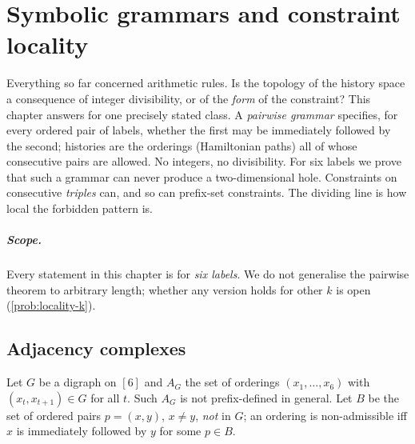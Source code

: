 \chapter{Symbolic grammars and constraint locality}\label{ch:locality}

Everything so far concerned arithmetic rules. Is the topology of the history space a consequence of integer divisibility, or of the \emph{form} of the constraint? This chapter answers for one precisely stated class. A \emph{pairwise grammar} specifies, for every ordered pair of labels, whether the first may be immediately followed by the second; histories are the orderings (Hamiltonian paths) all of whose consecutive pairs are allowed. No integers, no divisibility. For six labels we prove that such a grammar can never produce a two-dimensional hole. Constraints on consecutive \emph{triples} can, and so can prefix-set constraints. The dividing line is how local the forbidden pattern is.

\paragraph{Scope.} Every statement in this chapter is for \emph{six labels}. We do not generalise the pairwise theorem to arbitrary length; whether any version holds for other $k$ is open (\cref{prob:locality-k}).

\section{Adjacency complexes}\label{sec:adjacency}
Let $G$ be a digraph on $[6]$ and $A_G$ the set of orderings $(x_1,\dots,x_6)$ with $(x_t,x_{t+1})\in G$ for all $t$. Such $A_G$ is not prefix-defined in general. Let $B$ be the set of ordered pairs $p=(x,y)$, $x\ne y$, \emph{not} in $G$; an ordering is non-admissible iff $x$ is immediately followed by $y$ for some $p\in B$.

